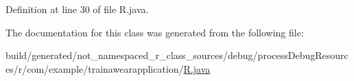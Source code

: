 Definition at line 30 of file R.\+java.



The documentation for this class was generated from the following file\+:\begin{DoxyCompactItemize}
\item 
build/generated/not\+\_\+namespaced\+\_\+r\+\_\+class\+\_\+sources/debug/process\+Debug\+Resources/r/com/example/trainawearapplication/\mbox{\hyperlink{com_2example_2trainawearapplication_2_r_8java}{R.\+java}}\end{DoxyCompactItemize}
